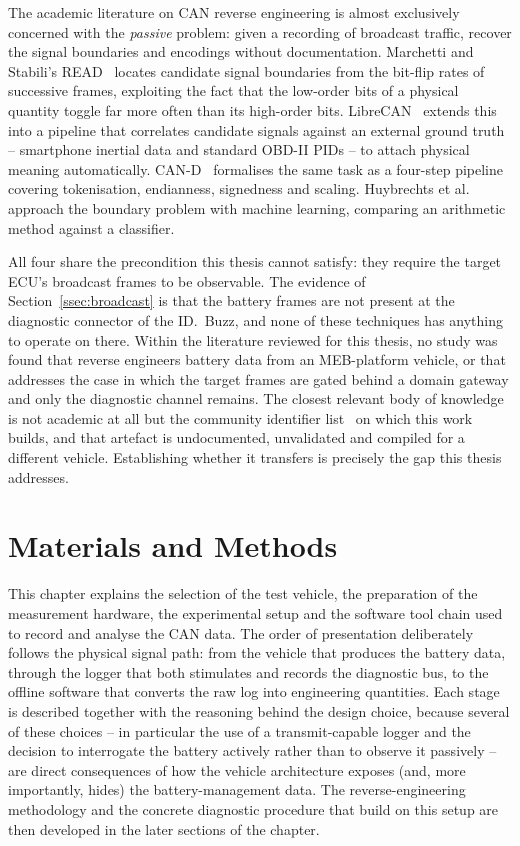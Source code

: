 \documentclass[11pt,a4paper,oneside,parskip=half]{scrreprt}
\begin{document}
The academic literature on CAN reverse engineering is almost exclusively concerned with the \emph{passive} problem: given a recording of broadcast traffic, recover the signal boundaries and encodings without documentation. Marchetti and Stabili's READ~\cite{read} locates candidate signal boundaries from the bit-flip rates of successive frames, exploiting the fact that the low-order bits of a physical quantity toggle far more often than its high-order bits. LibreCAN~\cite{librecan} extends this into a pipeline that correlates candidate signals against an external ground truth -- smartphone inertial data and standard OBD-II PIDs -- to attach physical meaning automatically. CAN-D~\cite{cand} formalises the same task as a four-step pipeline covering tokenisation, endianness, signedness and scaling. Huybrechts et al.~\cite{huybrechts2018automatic} approach the boundary problem with machine learning, comparing an arithmetic method against a classifier.

All four share the precondition this thesis cannot satisfy: they require the target ECU's broadcast frames to be observable. The evidence of Section~\ref{ssec:broadcast} is that the battery frames are not present at the diagnostic connector of the ID.~Buzz, and none of these techniques has anything to operate on there. Within the literature reviewed for this thesis, no study was found that reverse engineers battery data from an MEB-platform vehicle, or that addresses the case in which the target frames are gated behind a domain gateway and only the diagnostic channel remains. The closest relevant body of knowledge is not academic at all but the community identifier list~\cite{vwmebpidlist} on which this work builds, and that artefact is undocumented, unvalidated and compiled for a different vehicle. Establishing whether it transfers is precisely the gap this thesis addresses.


\chapter{Materials and Methods}
This chapter explains the selection of the test vehicle, the preparation of the measurement hardware, the experimental setup and the software tool chain used to record and analyse the CAN data. The order of presentation deliberately follows the physical signal path: from the vehicle that produces the battery data, through the logger that both stimulates and records the diagnostic bus, to the offline software that converts the raw log into engineering quantities. Each stage is described together with the reasoning behind the design choice, because several of these choices -- in particular the use of a transmit-capable logger and the decision to interrogate the battery actively rather than to observe it passively -- are direct consequences of how the vehicle architecture exposes (and, more importantly, hides) the battery-management data. The reverse-engineering methodology and the concrete diagnostic procedure that build on this setup are then developed in the later sections of the chapter.
\end{document}
